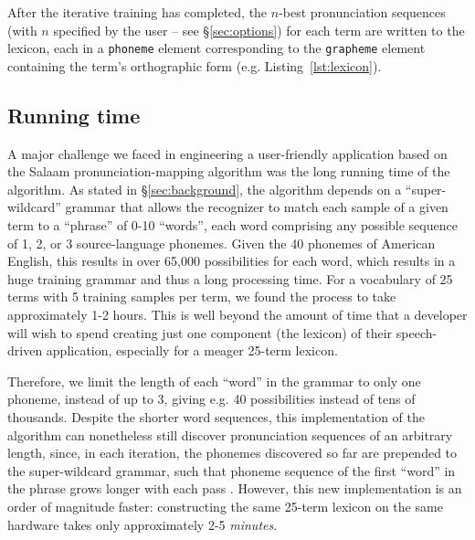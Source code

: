 \documentclass[11pt]{article}
\begin{document}

After the iterative training has completed, the $n$-best pronunciation sequences (with $n$ specified by the user -- see \S\ref{sec:options}) for each term are written to the lexicon, each in a \texttt{phoneme} element corresponding to the \texttt{grapheme} element containing the term's orthographic form (e.g. Listing~\ref{lst:lexicon}).

\subsection{Running time}
\label{sec:runningtime}

A major challenge we faced in engineering a user-friendly application based on the Salaam pronunciation-mapping algorithm \cite{Qiao10} was the long running time of the algorithm. As stated in \S\ref{sec:background}, the algorithm 
depends on a ``super-wildcard'' grammar that allows the recognizer to match each sample of a given term to a ``phrase'' of 0-10 ``words'', each word comprising any possible sequence of 1, 2, or 3 source-language phonemes. Given the 40 phonemes of American English, this results in over 65,000 possibilities for each word, which results in a huge training grammar and thus a long processing time. For a vocabulary of 25 terms with 5 training samples per term, we found the process to take approximately 1-2 hours. This is well beyond the amount of time that a developer will wish to spend creating just one component (the lexicon) of their speech-driven application, especially for a meager 25-term lexicon. 

Therefore, we limit the length of each ``word'' in the grammar to only one phoneme, instead of up to 3, giving e.g. 40 possibilities instead of tens of thousands. 
Despite the shorter word sequences, this implementation of the algorithm can nonetheless still discover pronunciation sequences of an arbitrary length, since, in each iteration, the phonemes discovered so far are prepended to the super-wildcard grammar, such that phoneme sequence of the first ``word'' in the phrase grows longer with each pass \cite[p.~4]{Qiao10}. 
However, this new implementation is an order of magnitude faster: constructing the same 25-term lexicon on the same hardware takes only approximately 2-5 \textit{minutes}. 
\end{document}
